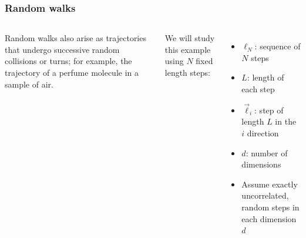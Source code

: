 \documentclass[hyperref={colorlinks=true}]{beamer}
\begin{document}
\begin{frame}%
  \frametitle{Random walks}
  
  \begin{columns}


    Random walks also arise as trajectories that undergo successive random collisions or turns; for example, the trajectory of a perfume molecule in a sample of air. 
    
    \vspace{0.5cm}    
    
    We will study this example using $N$ fixed length steps:
    
    \begin{itemize}
      \item $\ell_N$: sequence of $N$ steps
      \item $L$: length of each step
      \item $\vec{\ell}_i$: step of length $L$ in the $i$ direction
      \item $d$: number of dimensions
      \item Assume exactly uncorrelated, random steps in each dimension $d$
    \end{itemize}
    
    

\end{columns}
\end{frame}
\end{document}
